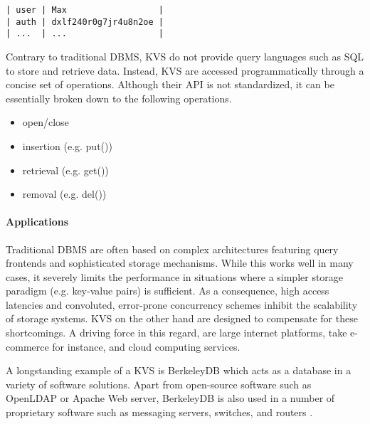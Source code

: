 \begin{lstlisting}
| user | Max                  |
| auth | dxlf240r0g7jr4u8n2oe |
| ...  | ...                  |
\end{lstlisting}

Contrary to traditional DBMS, KVS do not provide query languages such as SQL to
store and retrieve data. Instead, KVS are accessed programmatically through a
concise set of operations. Although their API is not standardized, it can be
essentially broken down to the following operations.

\begin{itemize}
    \item open/close
    \item insertion (e.g. put())
    \item retrieval (e.g. get())
    \item removal (e.g. del())
\end{itemize}

\paragraph{Applications}

Traditional DBMS are often based on complex architectures featuring query
frontends and sophisticated storage mechanisms. While this works well in many
cases, it severely limits the performance in situations where a simpler storage
paradigm (e.g. key-value pairs) is sufficient. As a consequence, high access
latencies and convoluted, error-prone concurrency schemes inhibit the
scalability of storage systems. KVS on the other hand are designed to compensate
for these shortcomings. A driving force in this regard, are large internet
platforms, take e-commerce for instance, and cloud computing services.

A longstanding example of a KVS is BerkeleyDB which acts as a database in a
variety of software solutions. Apart from open-source software such as OpenLDAP
or Apache Web server, BerkeleyDB is also used in a number of proprietary
software such as messaging servers, switches, and routers
\cite{kaestner2007aspect, olson1999berkeley}.

